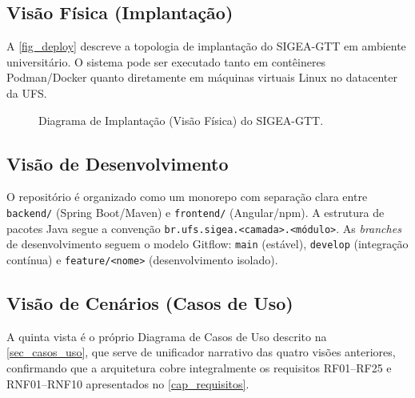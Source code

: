 \subsection{Visão Física (Implantação)}
\label{subsec_visao_fisica}

A \autoref{fig_deploy} descreve a topologia de implantação do SIGEA-GTT
em ambiente universitário. O sistema pode ser executado tanto em contêineres
Podman/Docker quanto diretamente em máquinas virtuais Linux no datacenter
da UFS.

\begin{figure}[htb]
\centering
\caption{Diagrama de Implantação (Visão Física) do SIGEA-GTT.}
\label{fig_deploy}
\end{figure}

\subsection{Visão de Desenvolvimento}
\label{subsec_visao_desenv}

O repositório é organizado como um monorepo com separação clara entre
\texttt{backend/} (Spring Boot/Maven) e \texttt{frontend/} (Angular/npm).
A estrutura de pacotes Java segue a convenção
\texttt{br.ufs.sigea.<camada>.<módulo>}. As \textit{branches} de
desenvolvimento seguem o modelo Gitflow: \texttt{main} (estável),
\texttt{develop} (integração contínua) e \texttt{feature/<nome>}
(desenvolvimento isolado).

\subsection{Visão de Cenários (Casos de Uso)}
\label{subsec_visao_cenarios}

A quinta vista é o próprio Diagrama de Casos de Uso descrito na
\autoref{sec_casos_uso}, que serve de unificador narrativo das quatro
visões anteriores, confirmando que a arquitetura cobre integralmente
os requisitos RF01--RF25 e RNF01--RNF10 apresentados no
\autoref{cap_requisitos}.
